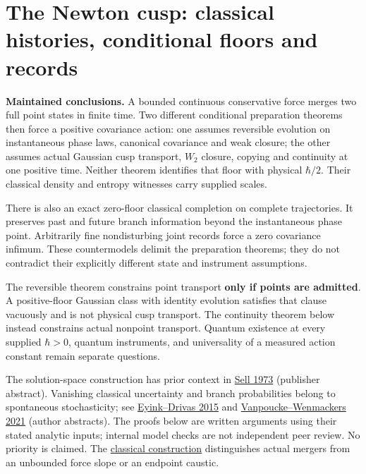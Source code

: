 \documentclass[11pt,a4paper]{article}
\begin{document}
\hypertarget{the-newton-cusp-classical-histories-conditional-floors-and-records}{%
\section{The Newton cusp: classical histories, conditional floors and
records}\label{the-newton-cusp-classical-histories-conditional-floors-and-records}}

\textbf{Maintained conclusions.} A bounded continuous conservative force
merges two full point states in finite time. Two different conditional
preparation theorems then force a positive covariance action: one
assumes reversible evolution on instantaneous phase laws, canonical
covariance and weak closure; the other assumes actual Gaussian cusp
transport, \(W_2\) closure, copying and continuity at one positive time.
Neither theorem identifies that floor with physical \(\hbar/2\). Their
classical density and entropy witnesses carry supplied scales.

There is also an exact zero-floor classical completion on complete
trajectories. It preserves past and future branch information beyond the
instantaneous phase point. Arbitrarily fine nondisturbing joint records
force a zero covariance infimum. These countermodels delimit the
preparation theorems; they do not contradict their explicitly different
state and instrument assumptions.

The reversible theorem constrains point transport \textbf{only if points
are admitted}. A positive-floor Gaussian class with identity evolution
satisfies that clause vacuously and is not physical cusp transport. The
continuity theorem below instead constrains actual nonpoint transport.
Quantum existence at every supplied \(\hbar>0\), quantum instruments,
and universality of a measured action constant remain separate
questions.

The solution-space construction has prior context in
\href{https://doi.org/10.1016/0022-0396(73)90075-2}{Sell 1973}
(publisher abstract). Vanishing classical uncertainty and branch
probabilities belong to spontaneous stochasticity; see
\href{https://arxiv.org/abs/1509.04941}{Eyink--Drivas 2015} and
\href{https://doi.org/10.1063/5.0063388}{Vanpoucke--Wenmackers 2021}
(author abstracts). The proofs below are written arguments using their
stated analytic inputs; internal model checks are not independent peer
review. No priority is claimed. The
\href{balaban-ode-lesson.md}{classical construction} distinguishes
actual mergers from an unbounded force slope or an endpoint caustic.
\end{document}
